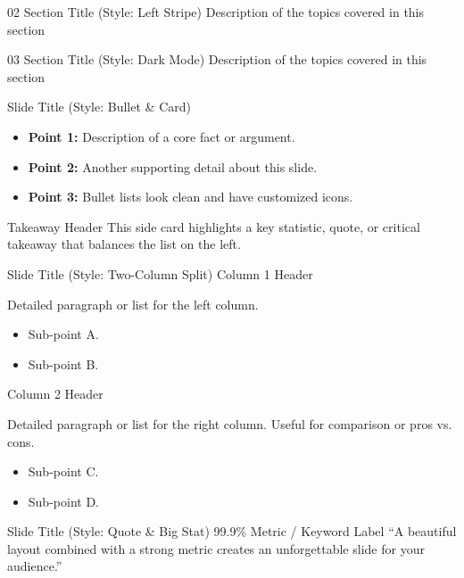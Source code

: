 \documentclass[aspectratio=169]{beamer}
\begin{document}
\sectionSlideStripe
  {02} %
  {Section Title (Style: Left Stripe)} %
  {Description of the topics covered in this section} %

\sectionSlideDark
  {03} %
  {Section Title (Style: Dark Mode)} %
  {Description of the topics covered in this section} %



\contentSlideBulletCard
  {Slide Title (Style: Bullet \& Card)}
  {
    \begin{itemize}
      \item \textbf{Point 1:} Description of a core fact or argument.
      \item \textbf{Point 2:} Another supporting detail about this slide.
      \item \textbf{Point 3:} Bullet lists look clean and have customized icons.
    \end{itemize}
  }
  {Takeaway Header}
  {This side card highlights a key statistic, quote, or critical takeaway that balances the list on the left.}

\contentSlideTwoCols
  {Slide Title (Style: Two-Column Split)}
  {Column 1 Header}
  {
    Detailed paragraph or list for the left column.
    \begin{itemize}
      \item Sub-point A.
      \item Sub-point B.
    \end{itemize}
  }
  {Column 2 Header}
  {
    Detailed paragraph or list for the right column. Useful for comparison or pros vs. cons.
    \begin{itemize}
      \item Sub-point C.
      \item Sub-point D.
    \end{itemize}
  }

\contentSlideQuoteStat
  {Slide Title (Style: Quote \& Big Stat)}
  {99.9\%} %
  {Metric / Keyword Label} %
  {“A beautiful layout combined with a strong metric creates an unforgettable slide for your audience.”} %
\end{document}

